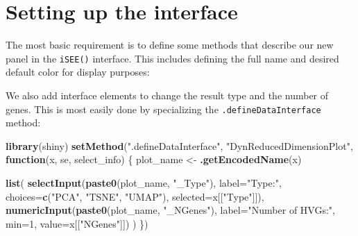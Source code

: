 \documentclass[]{book}
\newenvironment{Shaded}{\begin{snugshade}}{\end{snugshade}}
\newcommand{\KeywordTok}[1]{\textcolor[rgb]{0.13,0.29,0.53}{\textbf{#1}}}
\newcommand{\DataTypeTok}[1]{\textcolor[rgb]{0.13,0.29,0.53}{#1}}
\newcommand{\DecValTok}[1]{\textcolor[rgb]{0.00,0.00,0.81}{#1}}
\newcommand{\StringTok}[1]{\textcolor[rgb]{0.31,0.60,0.02}{#1}}
\newcommand{\ControlFlowTok}[1]{\textcolor[rgb]{0.13,0.29,0.53}{\textbf{#1}}}
\newcommand{\NormalTok}[1]{#1}
\begin{document}
\section{Setting up the interface}\label{setting-up-the-interface}

The most basic requirement is to define some methods that describe our
new panel in the \texttt{iSEE()} interface. This includes defining the
full name and desired default color for display purposes:

\begin{Shaded}
\end{Shaded}

We also add interface elements to change the result type and the number
of genes. This is most easily done by specializing the
\texttt{.defineDataInterface} method:

\begin{Shaded}
\begin{Highlighting}[]
\KeywordTok{library}\NormalTok{(shiny)}
\KeywordTok{setMethod}\NormalTok{(}\StringTok{".defineDataInterface"}\NormalTok{, }\StringTok{"DynReducedDimensionPlot"}\NormalTok{, }\ControlFlowTok{function}\NormalTok{(x, se, select_info) \{}
\NormalTok{    plot_name <-}\StringTok{ }\KeywordTok{.getEncodedName}\NormalTok{(x)}

    \KeywordTok{list}\NormalTok{(}
        \KeywordTok{selectInput}\NormalTok{(}\KeywordTok{paste0}\NormalTok{(plot_name, }\StringTok{"_Type"}\NormalTok{), }\DataTypeTok{label=}\StringTok{"Type:"}\NormalTok{,}
            \DataTypeTok{choices=}\KeywordTok{c}\NormalTok{(}\StringTok{"PCA"}\NormalTok{, }\StringTok{"TSNE"}\NormalTok{, }\StringTok{"UMAP"}\NormalTok{), }\DataTypeTok{selected=}\NormalTok{x[[}\StringTok{"Type"}\NormalTok{]]),}
        \KeywordTok{numericInput}\NormalTok{(}\KeywordTok{paste0}\NormalTok{(plot_name, }\StringTok{"_NGenes"}\NormalTok{), }\DataTypeTok{label=}\StringTok{"Number of HVGs:"}\NormalTok{,}
            \DataTypeTok{min=}\DecValTok{1}\NormalTok{, }\DataTypeTok{value=}\NormalTok{x[[}\StringTok{"NGenes"}\NormalTok{]])}
\NormalTok{    )}
\NormalTok{\})}
\end{Highlighting}
\end{Shaded}
\end{document}
